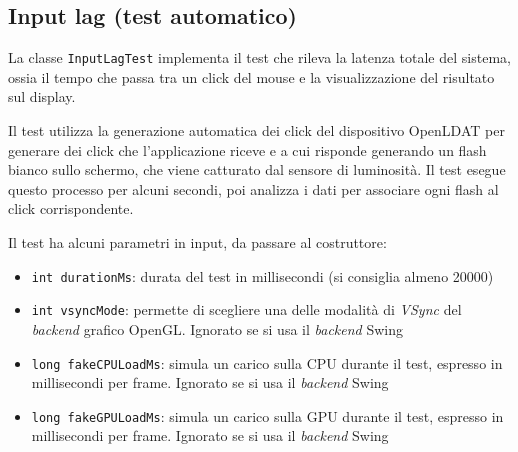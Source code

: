 \subsection{Input lag (test automatico)}
La classe \texttt{InputLagTest} implementa il test che rileva la latenza totale del sistema, ossia il tempo che passa tra un click del mouse e la visualizzazione del risultato sul display.

Il test utilizza la generazione automatica dei click del dispositivo OpenLDAT per generare dei click che l'applicazione riceve e a cui risponde generando un flash bianco sullo schermo, che viene catturato dal sensore di luminosità. Il test esegue questo processo per alcuni secondi, poi analizza i dati per associare ogni flash al click corrispondente.

Il test ha alcuni parametri in input, da passare al costruttore:\begin{itemize}
	\item \texttt{int durationMs}: durata del test in millisecondi (si consiglia almeno 20000)
	\item \texttt{int vsyncMode}: permette di scegliere una delle modalità di \textit{VSync} del \textit{backend} grafico OpenGL. Ignorato se si usa il \textit{backend} Swing
	\item \texttt{long fakeCPULoadMs}: simula un carico sulla CPU durante il test, espresso in millisecondi per frame. Ignorato se si usa il \textit{backend} Swing
	\item \texttt{long fakeGPULoadMs}: simula un carico sulla GPU durante il test, espresso in millisecondi per frame. Ignorato se si usa il \textit{backend} Swing
\end{itemize}

